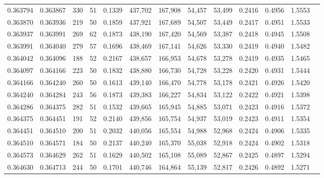 \begin{tabular}{rrrrrrrrrrrrr}
0.363794 & 0.363867 &   330 &  51 &                                     0.1339 & 437,702 & 167,908 &  54,457 &  53,499 & 0.2416 & 0.4956 & 1.5553 \\
0.363870 & 0.363936 &   219 &  50 &                                     0.1859 & 437,921 & 167,689 &  54,507 &  53,449 & 0.2417 & 0.4951 & 1.5533 \\
0.363937 & 0.363991 &   269 &  62 &                                     0.1873 & 438,190 & 167,420 &  54,569 &  53,387 & 0.2418 & 0.4945 & 1.5508 \\
0.363991 & 0.364040 &   279 &  57 &                                     0.1696 & 438,469 & 167,141 &  54,626 &  53,330 & 0.2419 & 0.4940 & 1.5482 \\
0.364042 & 0.364096 &   188 &  52 &                                     0.2167 & 438,657 & 166,953 &  54,678 &  53,278 & 0.2419 & 0.4935 & 1.5465 \\
0.364097 & 0.364166 &   223 &  50 &                                     0.1832 & 438,880 & 166,730 &  54,728 &  53,228 & 0.2420 & 0.4931 & 1.5444 \\
0.364166 & 0.364240 &   260 &  50 &                                     0.1613 & 439,140 & 166,470 &  54,778 &  53,178 & 0.2421 & 0.4926 & 1.5420 \\
0.364240 & 0.364284 &   243 &  56 &                                     0.1873 & 439,383 & 166,227 &  54,834 &  53,122 & 0.2422 & 0.4921 & 1.5398 \\
0.364286 & 0.364375 &   282 &  51 &                                     0.1532 & 439,665 & 165,945 &  54,885 &  53,071 & 0.2423 & 0.4916 & 1.5372 \\
0.364375 & 0.364451 &   191 &  52 &                                     0.2140 & 439,856 & 165,754 &  54,937 &  53,019 & 0.2423 & 0.4911 & 1.5354 \\
0.364451 & 0.364510 &   200 &  51 &                                     0.2032 & 440,056 & 165,554 &  54,988 &  52,968 & 0.2424 & 0.4906 & 1.5335 \\
0.364510 & 0.364571 &   184 &  50 &                                     0.2137 & 440,240 & 165,370 &  55,038 &  52,918 & 0.2424 & 0.4902 & 1.5318 \\
0.364573 & 0.364629 &   262 &  51 &                                     0.1629 & 440,502 & 165,108 &  55,089 &  52,867 & 0.2425 & 0.4897 & 1.5294 \\
0.364630 & 0.364713 &   244 &  50 &                                     0.1701 & 440,746 & 164,864 &  55,139 &  52,817 & 0.2426 & 0.4892 & 1.5271 \\

\end{tabular}
